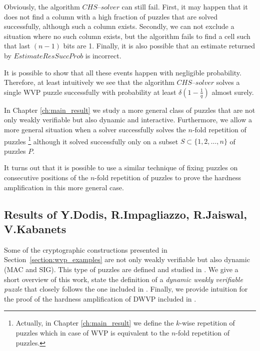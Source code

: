 Obviously, the algorithm $\mathit{CHS\text{--}solver}$ can still fail. First, it may happen that it does not find a column
with a high fraction of puzzles that are solved successfully, although such a column exists.
Secondly, we can not exclude a situation where no such column exists, but the algorithm fails to find a cell such that last $(n-1)$ bits are 1.
Finally, it is also possible that an estimate returned by $\mathit{EstimateResSuccProb}$ is incorrect.

It is possible to show that all these events happen with negligible probability.
Therefore, at least intuitively we see that the algorithm $\mathit{CHS\text{--}solver}$
solves a single WVP puzzle successfully with probability at least $\delta(1-\frac{1}{q})$ almost surely.

In Chapter \ref{ch:main_result} we study a more general class of puzzles that are not only weakly verifiable but also dynamic and interactive.
Furthermore, we allow a more general situation when a solver successfully solves the $n$-fold repetition of puzzles
\footnote{Actually, in Chapter \ref{ch:main_result} we define the $k$-wise repetition of puzzles
which in case of WVP is equivalent to the $n$-fold repetition of puzzles.}
although it solved successfully only on a subset $S \subset \{1,2,\dotsc, n\}$ of puzzles $P$.

It turns out that it is possible to use a similar technique of fixing puzzles on consecutive positions of the $n$-fold repetition of
puzzles to prove the hardness amplification in this more general case.
%
\subsection{Results of Y.Dodis, R.Impagliazzo, R.Jaiswal, V.Kabanets}
\label{subsec:dijk}
Some of the cryptographic constructions presented in Section~\ref{section:wvp_examples}
are not only weakly verifiable but also dynamic (MAC and SIG). This type of puzzles are defined and studied in \cite{Dodis:2009:SAI:1530441.1530450}.
We give a short overview of this work, state the definition of a \textit{dynamic weakly verifiable puzzle} that closely follows
the one included in \cite{Dodis:2009:SAI:1530441.1530450}. Finally, we provide intuition for the proof of the hardness amplification of DWVP
included in \cite{Dodis:2009:SAI:1530441.1530450}.

